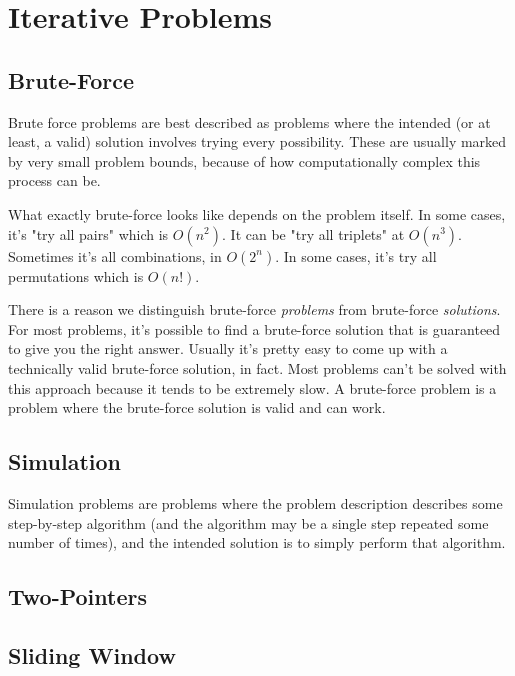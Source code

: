 \section{Iterative Problems}
\subsection{Brute-Force}

Brute force problems are best described as problems where the intended (or at least, a valid) solution involves trying every possibility. These are usually marked by very small problem bounds, because of how computationally complex this process can be.

What exactly brute-force looks like depends on the problem itself. In some cases, it's "try all pairs" which is $O(n^2)$. It can be "try all triplets" at $O(n^3)$. Sometimes it's all combinations, in $O(2^n)$. In some cases, it's try all permutations which is $O(n!)$.

There is a reason we distinguish brute-force \textit{problems} from brute-force \textit{solutions}. For most problems, it's possible to find a brute-force solution that is guaranteed to give you the right answer. Usually it's pretty easy to come up with a technically valid brute-force solution, in fact. Most problems can't be solved with this approach because it tends to be extremely slow. A brute-force problem is a problem where the brute-force solution is valid and can work.

\subsection{Simulation}

Simulation problems are problems where the problem description describes some step-by-step algorithm (and the algorithm may be a single step repeated some number of times), and the intended solution is to simply perform that algorithm.

\hrulefill



\hrulefill

\subsection{Two-Pointers}
\subsection{Sliding Window}
